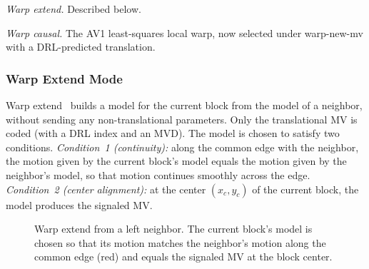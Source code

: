 \documentclass[journal]{IEEEtran}
\begin{document}
\emph{Warp extend.} Described below.

\emph{Warp causal.} The AV1 least-squares local warp, now selected under
warp-new-mv with a DRL-predicted translation.

\subsubsection{Warp Extend Mode}
Warp extend~\cite{cwgC050} builds a model for the current block from the model of a
neighbor, without sending any non-translational parameters. Only the
translational MV is coded (with a DRL index and an MVD). The model is chosen
to satisfy two conditions. \emph{Condition~1 (continuity):} along the common
edge with the neighbor, the motion given by the current block's model equals
the motion given by the neighbor's model, so that motion continues smoothly
across the edge. \emph{Condition~2 (center alignment):} at the center
$(x_c,y_c)$ of the current block, the model produces the signaled MV.

\begin{figure}[t]
  \centering
  \caption{Warp extend from a left neighbor. The current block's model is
  chosen so that its motion matches the neighbor's motion along the common
  edge (red) and equals the signaled MV at the block center.}
  \label{fig:warp_extend}
\end{figure}
\end{document}
